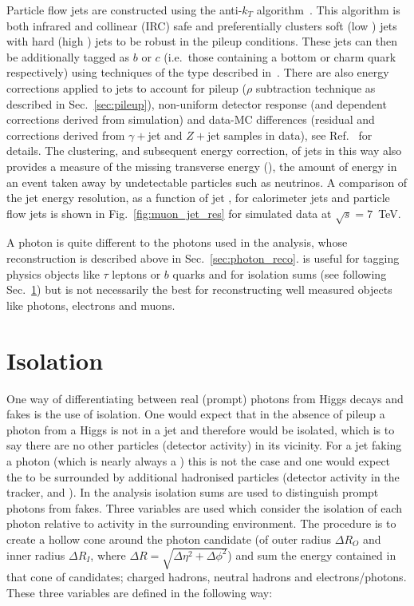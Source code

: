 Particle flow jets are constructed using the anti-$k_{T}$ algorithm~\cite{anti_kt_algo}. This algorithm is both infrared and collinear (IRC) safe and preferentially clusters soft (low \pT) jets with hard (high \pT) jets to be robust in the \LHC pileup conditions. These jets can then be additionally tagged as $b$ or $c$ (i.e.~those containing a bottom or charm quark respectively) using techniques of the type described in~\cite{b_tag}. There are also energy corrections applied to jets to account for pileup ($\rho$ subtraction technique as described in Sec.~\ref{sec:pileup}), non-uniform detector response (\pT and \eta dependent corrections derived from \MC simulation) and data-MC differences (residual \pT and \eta corrections derived from $\gamma+$jet and $Z+$jet samples in data), see Ref.~\cite{jet_e_corrs} for details. The clustering, and subsequent energy correction, of jets in this way also provides a measure of the missing transverse energy (\MET), the amount of energy in an event taken away by undetectable particles such as neutrinos. A comparison of the jet energy resolution, as a function of jet \pT, for calorimeter jets and particle flow jets is shown in Fig.~\ref{fig:muon_jet_res} for simulated data at $\sqrt{s}=7$~TeV.

A \PF photon is quite different to the photons used in the analysis, whose reconstruction is described above in Sec.~\ref{sec:photon_reco}. \PF is useful for tagging physics objects like $\tau$ leptons or $b$ quarks and for isolation sums (see following Sec.~\ref{sec:iso}) but is not necessarily the best for reconstructing well measured objects like photons, electrons and muons.

\section{Isolation}
\label{sec:iso}

One way of differentiating between real (prompt) photons from Higgs decays and fakes is the use of isolation. One would expect that in the absence of pileup a photon from a Higgs is not in a jet and therefore would be isolated, which is to say there are no other particles (detector activity) in its vicinity. For a jet faking a photon (which is nearly always a \pizero) this is not the case and one would expect the \pizero to be surrounded by additional hadronised particles (detector activity in the tracker, \ECAL and \HCAL). In the \CMS \Hgg analysis isolation sums are used to distinguish prompt photons from fakes. Three variables are used which consider the isolation of each photon relative to activity in the surrounding environment. The procedure is to create a hollow cone around the photon candidate (of outer radius $\Delta R_{O}$ and inner radius $\Delta R_{I}$, where $\Delta R = \sqrt{\Delta\eta^{2}+\Delta\phi^{2}}$) and sum the energy contained in that cone of \PF candidates; charged hadrons, neutral hadrons and electrons/photons. These three variables are defined in the following way:


